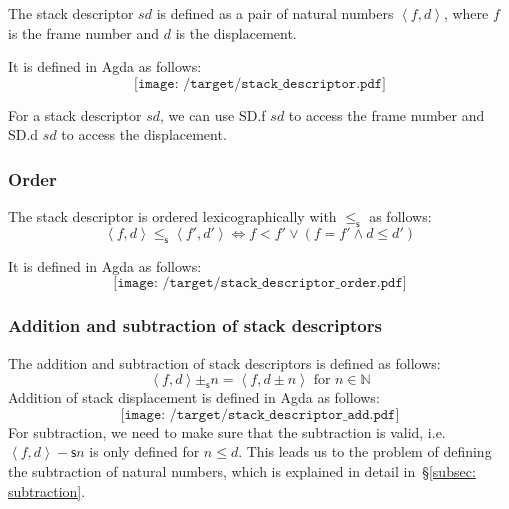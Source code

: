 \documentclass[12pt,a4paper]{report}
\theoremstyle{definition}
\newcommand{\secref}[1]{\S\ref{#1}}
\newcommand{\dpink}[1]{\textcolor{darkpink}{#1}}
\newcommand{\ang}[1]{\left\langle #1 \right\rangle}
\begin{document}
    The stack descriptor $\textit{sd}$ is defined as a pair of natural numbers $\ang{f, d}$, where $f$ is the frame number and $d$ is the displacement. 

    It is defined in Agda as follows:
    \[\texttt{[image: /target/stack\_descriptor.pdf]}\]

    For a stack descriptor $\textit{sd}$, we can use \dpink{SD.f} $\textit{sd}$ to access the frame number and \dpink{SD.d} $\textit{sd}$ to access the displacement. 

    \subsubsection{Order}
    The stack descriptor is ordered lexicographically with $\leq_\mathsf{s}$ as follows:
    \[\ang{f, d} \leq_\mathsf{s} \ang{f', d'} \Leftrightarrow f < f' \lor (f = f' \land d \leq d')\]

    It is defined in Agda as follows:
    \[\texttt{[image: /target/stack\_descriptor\_order.pdf]}\]

    \subsubsection{Addition and subtraction of stack descriptors}
    The addition and subtraction of stack descriptors is defined as follows:
    \[\ang{f, d} \pm_\mathsf{s} n = \ang{f, d \pm n} \text{ for } n \in \mathbb{N}\]
    Addition of stack displacement is defined in Agda as follows:
    \[\texttt{[image: /target/stack\_descriptor\_add.pdf]}\]
    For subtraction, we need to make sure that the subtraction is valid, i.e. $\ang{f, d} -\mathsf{s} n$ is only defined for $n \leq d$. This leads us to the problem of defining the subtraction of natural numbers, which is explained in detail in~\secref{subsec: subtraction}.
\end{document}
